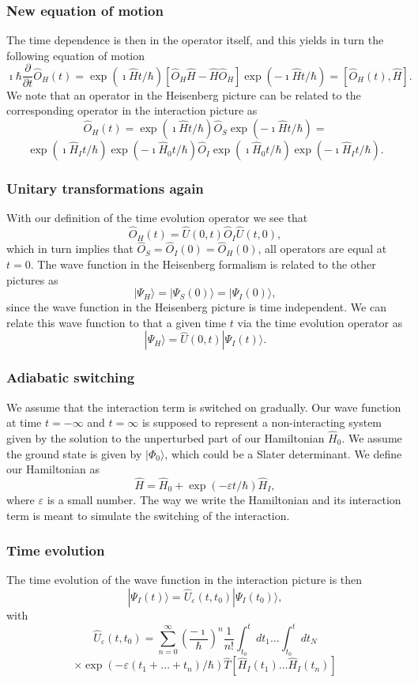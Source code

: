 \documentclass{beamer}
\begin{document}
\begin{frame}
\frametitle{New equation of motion}

The time dependence is then in the operator itself, and this yields in turn the
following equation of motion
\[
\imath \hbar\frac{\partial }{\partial t}\hat{O}_H(t) = \exp{(\imath\hat{H}t/\hbar)}\left[\hat{O}_H\hat{H}-\hat{H}\hat{O}_H\right]\exp{(-\imath\hat{H}t/\hbar)}=\left[\hat{O}_H(t),\hat{H}\right].
\]
We note that an operator in the Heisenberg picture can be related to the corresponding
operator in the interaction picture as 
\[
\hat{O}_H(t)=
\exp{(\imath\hat{H}t/\hbar)}\hat{O}_S\exp{(-\imath\hat{H}t/\hbar)}=
\]
\[
\exp{(\imath\hat{H}_It/\hbar)}\exp{(-\imath\hat{H}_0t/\hbar)}\hat{O}_I\exp{(\imath\hat{H}_0t/\hbar)}\exp{(-\imath\hat{H}_It/\hbar)}.
\]
\end{frame}

\begin{frame}
\frametitle{Unitary transformations again}

With our definition of the time evolution operator we see that
\[
\hat{O}_H(t)=\hat{U}(0,t)\hat{O}_I\hat{U}(t,0),
\]
which in turn implies that $\hat{O}_S=\hat{O}_I(0)=\hat{O}_H(0)$, all operators are equal at $t=0$. The wave function in the Heisenberg formalism is 
related to the other pictures as 
\[
|\Psi_H\rangle=|\Psi_S(0)\rangle=|\Psi_I(0)\rangle,
\]
since the wave function in the Heisenberg picture is time independent. 
We can relate this wave function to that a given time $t$ via the time evolution operator as
\[
|\Psi_H\rangle=\hat{U}(0,t)|\Psi_I(t)\rangle.
\]
\end{frame}

\begin{frame}
\frametitle{Adiabatic switching}

We assume that the interaction term is switched on gradually. Our wave function at time $t=-\infty$ and $t=\infty$ is supposed to represent a non-interacting system
given by the solution to the unperturbed part of our Hamiltonian $\hat{H}_0$.
We assume the ground state is given by $|\Phi_0\rangle$, which could be a Slater determinant.
We define our Hamiltonian as
\[
\hat{H}=\hat{H}_0+\exp{(-\varepsilon t/\hbar)}\hat{H}_I,
\]
where $\varepsilon$ is a small number. The way we write the Hamiltonian 
and its interaction term is meant to simulate the switching of the interaction.
\end{frame}

\begin{frame}
\frametitle{Time evolution}

The time evolution of the wave function in the interaction picture is then
\[
|\Psi_I(t) \rangle = \hat{U}_{\varepsilon}(t,t_0)|\Psi_I(t_0)\rangle,
\]
with 
\[
\hat{U}_{\varepsilon}(t,t_0)=\sum_{n=0}^{\infty}\left(\frac{-\imath}{\hbar}\right)^n\frac{1}{n!}
\int_{t_0}^t dt_1\dots \int_{t_0}^t dt_N
\]
\[
\times \exp{(-\varepsilon(t_1+\dots+t_n)/\hbar)}\hat{T}\left[\hat{H}_I(t_1)\dots\hat{H}_I(t_n)\right]
\]
\end{frame}
\end{document}
